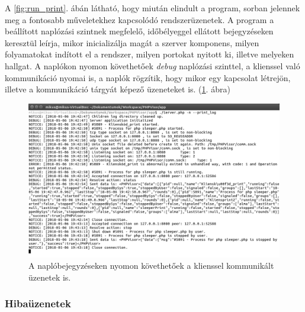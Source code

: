 \documentclass[12pt]{report}
\begin{document}
A \ref{fig:run_print}. ábán látható, hogy miután elindult a program, sorban jelennek meg a fontosabb műveletekhez kapcsolódó rendszerüzenetek. A program a beállított naplózási szintnek megfelelő, időbélyeggel ellátott bejegyzéseken keresztül leírja, mikor inicializálja magát a szerver komponens, milyen folyamatokat indított el a rendszer, milyen portokat nyitott ki, illetve melyeken hallgat. A naplókon nyomon követhetőek \textit{debug} naplózási szinttel, a klienssel való kommunikáció nyomai is, a naplók rögzítik, hogy mikor egy kapcsolat létrejön, illetve a kommunikáció tárgyát képező üzeneteket is. (\ref{fig:runcon}. ábra)
  \begin{figure}[ht]
  \centering
  \includegraphics[width=14cm]{pics/runcon.png}
	  \caption{A naplóbejegyzéseken nyomon követhetőek a klienssel kommunikált üzenetek is. \newline}
      \label{fig:runcon}
  \end{figure}

  \subsubsection{Hibaüzenetek}
\end{document}
